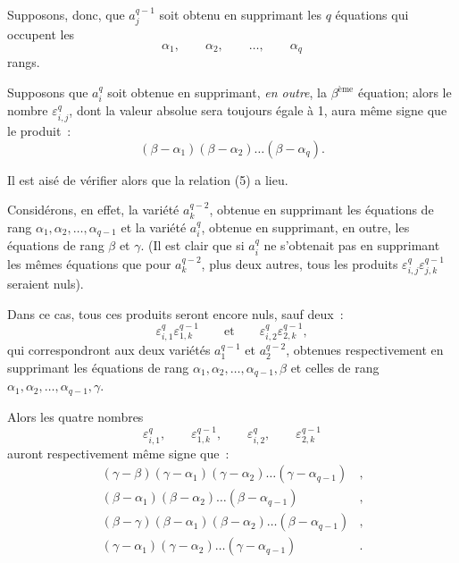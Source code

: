 \documentclass{article}
\begin{document}

Supposons, donc, que $a^{q-1}_{j}$ soit obtenu en supprimant les $q$ équations qui occupent les
\[ \alpha_{1}, \qquad \alpha_{2}, \qquad \ldots, \qquad \alpha_{q} \]
rangs.

Supposons que $a^{q}_{i}$ soit obtenue en supprimant, \emph{en outre}, la $\beta^{\text{ème}}$ équation; alors le nombre $\varepsilon^{q}_{i,j}$, dont la valeur absolue sera toujours égale à 1, aura même signe que le produit~:
\[ (\beta - \alpha_{1})(\beta - \alpha_{2}) \ldots (\beta - \alpha_{q}). \]

Il est aisé de vérifier alors que la relation (5) a lieu.

Considérons, en effet, la variété $a^{q-2}_{k}$, obtenue en supprimant les équations de rang $\alpha_{1}, \alpha_{2}, \ldots, \alpha_{q-1}$ et la variété $a^{q}_{i}$, obtenue en supprimant, en outre, les équations de rang $\beta$ et $\gamma$. (Il est clair que si $a^{q}_{i}$ ne s'obtenait pas en supprimant les mêmes équations que pour $a^{q-2}_{k}$, plus deux autres, tous les produits $\varepsilon^{q}_{i,j} \varepsilon^{q-1}_{j,k}$ seraient nuls).

Dans ce cas, tous ces produits seront encore nuls, sauf deux~:
\[ \varepsilon^{q}_{i,1} \varepsilon^{q-1}_{1,k} \qquad \text{et} \qquad \varepsilon^{q}_{i,2} \varepsilon^{q-1}_{2,k}, \]
qui correspondront aux deux variétés $a^{q-1}_{1}$ et $a^{q-2}_{2}$, obtenues respectivement en supprimant les équations de rang $\alpha_{1}, \alpha_{2}, \ldots, \alpha_{q-1}, \beta$ et celles de rang $\alpha_{1}, \alpha_{2}, \ldots, \alpha_{q-1}, \gamma$.

Alors les quatre nombres
\[ \varepsilon^{q}_{i,1}, \qquad \varepsilon^{q-1}_{1,k}, \qquad \varepsilon^{q}_{i,2}, \qquad \varepsilon^{q-1}_{2,k} \]
auront respectivement même signe que~:
\[ \begin{aligned} (\gamma - \beta)(\gamma - \alpha_{1})(\gamma - \alpha_{2}) \ldots (\gamma - \alpha_{q-1})&,\\ (\beta - \alpha_{1})(\beta - \alpha_{2}) \ldots (\beta - \alpha_{q-1})&,\\ (\beta - \gamma)(\beta - \alpha_{1})(\beta - \alpha_{2}) \ldots (\beta - \alpha_{q-1})&,\\ (\gamma - \alpha_{1})(\gamma - \alpha_{2}) \ldots (\gamma - \alpha_{q-1})&. \end{aligned} \]

\end{document}
